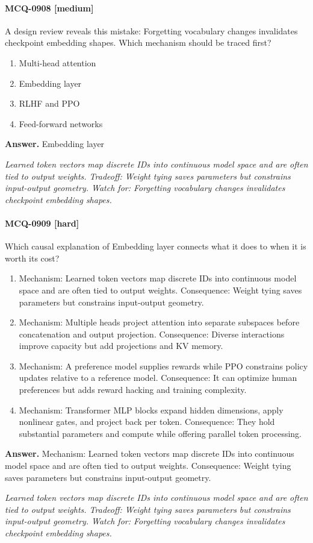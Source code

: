 \paragraph{MCQ-0908 [medium]} A design review reveals this mistake: Forgetting vocabulary changes invalidates checkpoint embedding shapes. Which mechanism should be traced first?
\begin{enumerate}[label=\Alph*.]
\item Multi-head attention
\item Embedding layer
\item RLHF and PPO
\item Feed-forward networks
\end{enumerate}
\noindent\textbf{Answer.} Embedding layer
\par\textit{Learned token vectors map discrete IDs into continuous model space and are often tied to output weights. Tradeoff: Weight tying saves parameters but constrains input-output geometry. Watch for: Forgetting vocabulary changes invalidates checkpoint embedding shapes.}
\paragraph{MCQ-0909 [hard]} Which causal explanation of Embedding layer connects what it does to when it is worth its cost?
\begin{enumerate}[label=\Alph*.]
\item Mechanism: Learned token vectors map discrete IDs into continuous model space and are often tied to output weights. Consequence: Weight tying saves parameters but constrains input-output geometry.
\item Mechanism: Multiple heads project attention into separate subspaces before concatenation and output projection. Consequence: Diverse interactions improve capacity but add projections and KV memory.
\item Mechanism: A preference model supplies rewards while PPO constrains policy updates relative to a reference model. Consequence: It can optimize human preferences but adds reward hacking and training complexity.
\item Mechanism: Transformer MLP blocks expand hidden dimensions, apply nonlinear gates, and project back per token. Consequence: They hold substantial parameters and compute while offering parallel token processing.
\end{enumerate}
\noindent\textbf{Answer.} Mechanism: Learned token vectors map discrete IDs into continuous model space and are often tied to output weights. Consequence: Weight tying saves parameters but constrains input-output geometry.
\par\textit{Learned token vectors map discrete IDs into continuous model space and are often tied to output weights. Tradeoff: Weight tying saves parameters but constrains input-output geometry. Watch for: Forgetting vocabulary changes invalidates checkpoint embedding shapes.}
